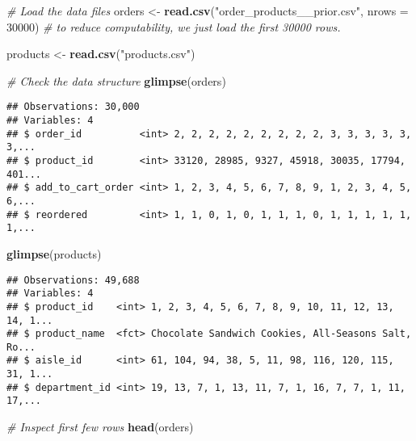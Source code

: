 \documentclass[]{article}
\newenvironment{Shaded}{\begin{snugshade}}{\end{snugshade}}
\newcommand{\CommentTok}[1]{\textcolor[rgb]{0.56,0.35,0.01}{\textit{#1}}}
\newcommand{\DataTypeTok}[1]{\textcolor[rgb]{0.13,0.29,0.53}{#1}}
\newcommand{\DecValTok}[1]{\textcolor[rgb]{0.00,0.00,0.81}{#1}}
\newcommand{\KeywordTok}[1]{\textcolor[rgb]{0.13,0.29,0.53}{\textbf{#1}}}
\newcommand{\NormalTok}[1]{#1}
\newcommand{\StringTok}[1]{\textcolor[rgb]{0.31,0.60,0.02}{#1}}
\begin{document}
\begin{Shaded}
\begin{Highlighting}[]
\CommentTok{# Load the data files}
\NormalTok{orders <-}\StringTok{ }\KeywordTok{read.csv}\NormalTok{(}\StringTok{"order_products__prior.csv"}\NormalTok{, }\DataTypeTok{nrows =} \DecValTok{30000}\NormalTok{) }\CommentTok{# to reduce computability, we just load the first 30000 rows.}

\NormalTok{products <-}\StringTok{ }\KeywordTok{read.csv}\NormalTok{(}\StringTok{"products.csv"}\NormalTok{)}
\end{Highlighting}
\end{Shaded}

\begin{Shaded}
\begin{Highlighting}[]
\CommentTok{# Check the data structure}
\KeywordTok{glimpse}\NormalTok{(orders)}
\end{Highlighting}
\end{Shaded}

\begin{verbatim}
## Observations: 30,000
## Variables: 4
## $ order_id          <int> 2, 2, 2, 2, 2, 2, 2, 2, 2, 3, 3, 3, 3, 3, 3,...
## $ product_id        <int> 33120, 28985, 9327, 45918, 30035, 17794, 401...
## $ add_to_cart_order <int> 1, 2, 3, 4, 5, 6, 7, 8, 9, 1, 2, 3, 4, 5, 6,...
## $ reordered         <int> 1, 1, 0, 1, 0, 1, 1, 1, 0, 1, 1, 1, 1, 1, 1,...
\end{verbatim}

\begin{Shaded}
\begin{Highlighting}[]
\KeywordTok{glimpse}\NormalTok{(products)}
\end{Highlighting}
\end{Shaded}

\begin{verbatim}
## Observations: 49,688
## Variables: 4
## $ product_id    <int> 1, 2, 3, 4, 5, 6, 7, 8, 9, 10, 11, 12, 13, 14, 1...
## $ product_name  <fct> Chocolate Sandwich Cookies, All-Seasons Salt, Ro...
## $ aisle_id      <int> 61, 104, 94, 38, 5, 11, 98, 116, 120, 115, 31, 1...
## $ department_id <int> 19, 13, 7, 1, 13, 11, 7, 1, 16, 7, 7, 1, 11, 17,...
\end{verbatim}

\begin{Shaded}
\begin{Highlighting}[]
\CommentTok{# Inspect first few rows}
\KeywordTok{head}\NormalTok{(orders)}
\end{Highlighting}
\end{Shaded}
\end{document}
